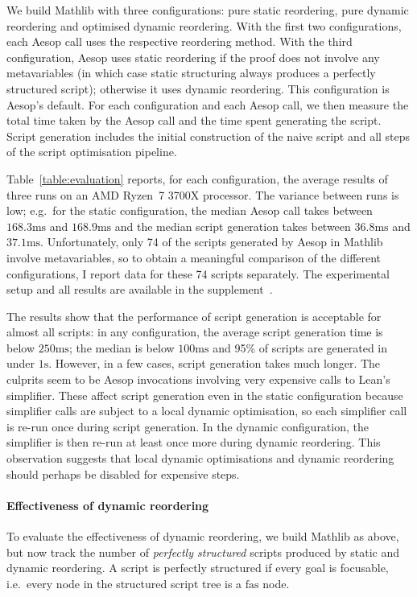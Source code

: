 \documentclass[sigplan,screen]{acmart}
\newcommand{\millis}{\ensuremath{\mathrm{ms}}}
\newcommand{\second}{\ensuremath{\mathrm{s}}}
\begin{document}
We build Mathlib with three configurations: pure static reordering, pure dynamic reordering and optimised dynamic reordering.
With the first two configurations, each Aesop call uses the respective reordering method.
With the third configuration, Aesop uses static reordering if the proof does not involve any metavariables (in which case static structuring always produces a perfectly structured script); otherwise it uses dynamic reordering.
This configuration is Aesop's default.
For each configuration and each Aesop call, we then measure the total time taken by the Aesop call and the time spent generating the script.
Script generation includes the initial construction of the naive script and all steps of the script optimisation pipeline.

Table~\ref{table:evaluation} reports, for each configuration, the average results of three runs on an AMD Ryzen~7 3700X processor.
The variance between runs is low; e.g.\ for the static configuration, the median Aesop call takes between $168.3\millis$ and $168.9\millis$ and the median script generation takes between $36.8\millis$ and $37.1\millis$.
Unfortunately, only 74 of the scripts generated by Aesop in Mathlib involve metavariables, so to obtain a meaningful comparison of the different configurations, I report data for these 74 scripts separately.
The experimental setup and all results are available in the supplement~\cite{supplement}.

The results show that the performance of script generation is acceptable for almost all scripts: in any configuration, the average script generation time is below $250\millis$; the median is below $100\millis$ and 95\% of scripts are generated in under $1\second$.
However, in a few cases, script generation takes much longer.
The culprits seem to be Aesop invocations involving very expensive calls to Lean's simplifier.
These affect script generation even in the static configuration because simplifier calls are subject to a local dynamic optimisation, so each simplifier call is re-run once during script generation.
In the dynamic configuration, the simplifier is then re-run at least once more during dynamic reordering.
This observation suggests that local dynamic optimisations and dynamic reordering should perhaps be disabled for expensive steps.

\paragraph{Effectiveness of dynamic reordering}
To evaluate the effectiveness of dynamic reordering, we build Mathlib as above, but now track the number of \emph{perfectly structured} scripts produced by static and dynamic reordering.
A script is perfectly structured if every goal is focusable, i.e.\ every node in the structured script tree is a $\mathrm{fas}$ node.
\end{document}
